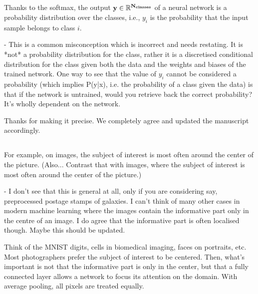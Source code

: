 \documentclass[12pt,a4paper]{article}
\newcommand{\nati}[1]{{\color[rgb]{.1,.6,.1}{NP: #1}}}
\newcommand{\mdeff}[1]{{\color[rgb]{.1,.6,.1}{MD: #1}}}
\newcommand{\1}{\b{1}}              %
\newcommand{\0}{\b{0}}              %
\begin{document}
\subsection{}
\begin{mdframed}[style=comment]
Thanks to the softmax, the output $\bf{y}\in\mathbb{R}^{N_{classes}}$ of a neural network is a probability distribution over the classes, i.e., $y_i$ is the probability that the input sample belongs to class $i$.

- This is a common misconception which is incorrect and needs restating. It is *not* a probability distribution for the class, rather it is a discretised conditional distribution for the class given both the data and the weights and biases of the trained network. One way to see that the value of $y_i$ cannot be considered a probability (which implies P(y|x), i.e. the probability of a class given the data) is that if the network is untrained, would you retrieve back the correct probability? It's wholly dependent on the network.
\end{mdframed}

Thanks for making it precise. We completely agree and updated the manuscript accordingly.


\subsection{}
\begin{mdframed}[style=comment]
For example, on images, the subject of interest is most often around the center of the picture. (Also... Contrast that with images, where the subject of interest is most often around the center of the picture.)

- I don't see that this is general at all, only if you are considering say, preprocessed postage stamps of galaxies. I can't think of many other cases in modern machine learning where the images contain the informative part only in the centre of an image. I do agree that the informative part is often localised though. Maybe this should be updated.
\end{mdframed}

Think of the MNIST digits, cells in biomedical imaging, faces on portraits, etc.
Most photographers prefer the subject of interest to be centered.
Then, what's important is not that the informative part is only in the center, but that a fully connected layer allows a network to focus its attention on the domain.
With average pooling, all pixels are treated equally.
\end{document}
